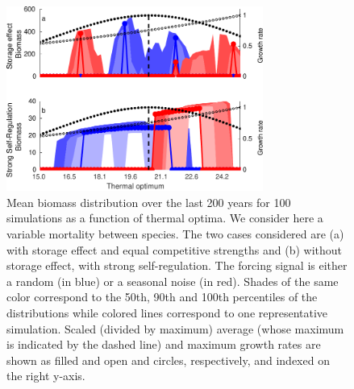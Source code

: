 \documentclass[a4paper,12pt]{article}
\begin{document}
\begin{figure}[!ht]
\begin{centering}
\includegraphics[width=0.75\textwidth]{Fig4_morta_variable-eps-converted-to.pdf}
\par\end{centering}
\caption{Mean biomass distribution over the last 200 years for 100 simulations as a function of thermal optima. 
We consider here a variable mortality between species. The two cases considered are (a) with storage effect and equal competitive
strengths and (b) without storage effect, with strong self-regulation. The forcing signal is either a random (in blue) or a seasonal
noise (in red). Shades of the same color correspond to the 50th, 90th and 100th percentiles of the distributions while colored lines correspond
to one representative simulation. Scaled (divided by maximum) average (whose maximum is indicated by the dashed line) and maximum growth
rates are shown as filled and open and circles, respectively, and indexed on the right y-axis.\label{fig:Fig4_morta_variable}}
\end{figure}
\end{document}
